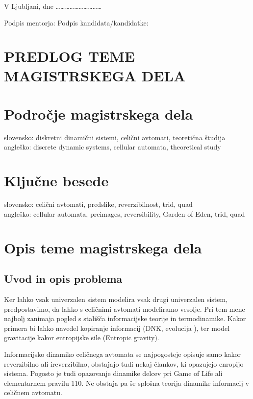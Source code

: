 \documentclass[a4paper, 12pt]{article}
\begin{document}
\bigskip

V Ljubljani, dne …………………………

Podpis mentorja: \hspace{180px} Podpis kandidata/kandidatke:




\clearpage
\section*{PREDLOG TEME MAGISTRSKEGA DELA}

\section{Področje magistrskega dela}

slovensko: diskretni dinamični sistemi, celični avtomati, teoretična študija \\
angleško: discrete dynamic systems, cellular automata, theoretical study


\section{Ključne besede}

slovensko: celični avtomati, predslike, reverzibilnost, trid, quad   \\
angleško: cellular automata, preimages, reversibility, Garden of Eden,  trid, quad


\section{Opis teme magistrskega dela}

\subsection{Uvod in opis problema}

Ker lahko vsak univerzalen sistem modelira vsak drugi univerzalen sistem, predpostavimo,
da lahko s celičnimi avtomati modeliramo vesolje. Pri tem mene najbolj zanimaja pogled s
stališča informacijske teorije in termodinamike. Kakor primera bi lahko navedel kopiranje informacij
(DNK, evolucija \cite{Salzberg2004}), ter model gravitacije kakor entropijske sile (Entropic gravity).

Informacijsko dinamiko celičnega avtomata se najpogosteje opisuje samo kakor reverzibilno ali ireverzibilno,
obstajajo tudi nekaj člankov, ki opazujejo enropijo sistema.
Pogosto je tudi opazovanje dinamike delcev pri Game of Life ali elementarnem pravilu 110.
Ne obstaja pa še splošna teorija dinamike informacij v celičnem avtomatu.
\end{document}

